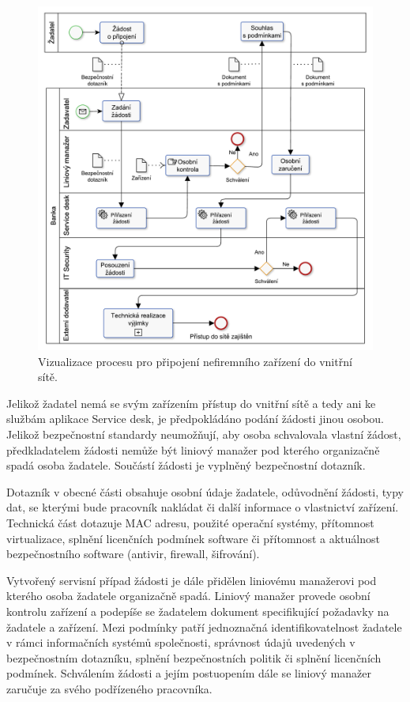 \begin{figure}[h!]
\centering
\includegraphics[width=13cm]{img/vyjimkaBPMN}
\caption{Vizualizace procesu pro připojení nefiremního zařízení do vnitřní sítě.\label{vyjimka}} 
\end{figure}

Jelikož žadatel nemá se svým zařízením přístup do vnitřní sítě a tedy ani ke službám aplikace Service desk, je předpokládáno podání žádosti jinou osobou. Jelikož bezpečnostní standardy neumožňují, aby osoba schvalovala vlastní žádost, předkladatelem žádosti nemůže být liniový manažer pod kterého organizačně spadá osoba žadatele. Součástí žádosti je vyplněný bezpečnostní dotazník. 

Dotazník v obecné části obsahuje osobní údaje žadatele, odůvodnění žádosti, typy dat, se kterými bude pracovník nakládat či další informace o vlastnictví zařízení. Technická část dotazuje MAC adresu, použité operační systémy, přítomnost virtualizace, splnění licenčních podmínek software či přítomnost a aktuálnost bezpečnostního software (antivir, firewall, šifrování).

Vytvořený servisní případ žádosti je dále přidělen liniovému manažerovi pod kterého osoba žadatele organizačně spadá. Liniový manažer provede osobní kontrolu zařízení a podepíše se žadatelem dokument specifikující požadavky na žadatele a zařízení. Mezi podmínky patří jednoznačná identifikovatelnost žadatele v rámci informačních systémů společnosti, správnost údajů uvedených v bezpečnostním dotazníku, splnění bezpečnostních politik či splnění licenčních podmínek. Schválením žádosti a jejím postuopením dále se liniový manažer zaručuje za svého podřízeného pracovníka.

